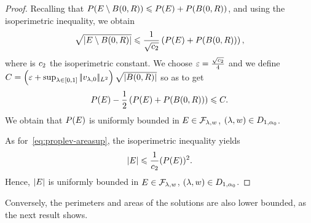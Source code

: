 \begin{proof}
%
  Recalling that $P(E\setminus B(0,R))\leqslant P(E)+ P(B(0,R))$, and using the isoperimetric inequality, we obtain
\begin{align*}
  \sqrt{\left| E\setminus B(0,R) \right|}\leqslant  \frac{1}{\sqrt{c_2}} \left(P(E) + P(B(0,R))\right),
\end{align*}
 where is $c_2$ the isoperimetric constant. We choose $\varepsilon=\frac{\sqrt{c_2}}{4}$ and we define $C=\left(\varepsilon +\sup_{\lambda\in[0,1]}|\!| v_{\lambda,0} |\!|_{L^2}\right) \sqrt{\left| B(0,R) \right|}$ so as to get 
\begin{align*}
  \label{eq:}
  P(E)-\frac{1}{2}\left(P(E) + P(B(0,R))\right)\leqslant C.
\end{align*}
We obtain that $P(E)$ is uniformly bounded in $E\in \mathcal{F}_{\lambda,w}$, $(\lambda,w)\in D_{1,\alpha_0}$.

As for~\eqref{eq:proplev-areasup}, the isoperimetric inequality yields
\begin{equation*}
  \left| E \right|\leqslant \frac{1}{c_2} (P(E))^{2}.
\end{equation*}
Hence, $\left| E \right|$ is uniformly bounded in $E\in \mathcal{F}_{\lambda,w}$, $(\lambda,w)\in D_{1,\alpha_0}$.
\end{proof}



Conversely, the perimeters and areas of the solutions are also lower bounded, as the next result shows.
  
